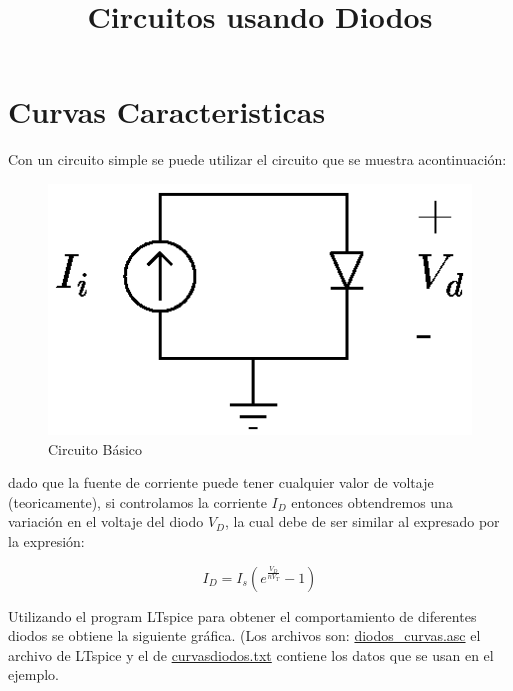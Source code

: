 \documentclass{article}
\title{Circuitos usando Diodos}
\begin{document}
    
    
    \maketitle
    
    

    
    \section{Curvas Caracteristicas}\label{curvas-caracteristicas}

Con un circuito simple se puede utilizar el circuito que se muestra
acontinuación:

\begin{figure}[htbp]
\centering
\includegraphics{images/curvadiodocir.png}
\caption{Circuito Básico}
\end{figure}

dado que la fuente de corriente puede tener cualquier valor de voltaje
(teoricamente), si controlamos la corriente $I_{D}$ entonces obtendremos
una variación en el voltaje del diodo $V_{D}$, la cual debe de ser
similar al expresado por la expresión:

\begin{equation}\label{eq:diodo}
I_{D}=I_{s}\left( e^{\frac{V_{D}}{nV_{T}}}-1\right)
\end{equation}

Utilizando el program LTspice para obtener el comportamiento de
diferentes diodos se obtiene la siguiente gráfica. (Los archivos son:
\href{http://cacie.ens.uabc.mx/~mmiranda/cursos/notas/Electronica/diodos_curva.asc}{diodos\_curvas.asc}
el archivo de LTspice y el de
\href{http://cacie.ens.uabc.mx/~mmiranda/cursos/notas/Electronica/curvasdiodos.txt}{curvasdiodos.txt}
contiene los datos que se usan en el ejemplo.


    \begin{center}
    \end{center}
    { \hspace*{\fill} \\}
    
\end{document}
